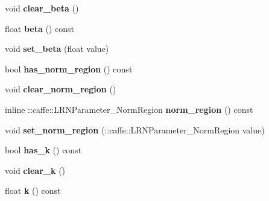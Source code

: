 \begin{DoxyCompactItemize}
\item 
\mbox{\label{classcaffe_1_1_l_r_n_parameter_aec1b14fce722dccf12d5630c13769550}} 
void {\bfseries clear\+\_\+beta} ()
\item 
\mbox{\label{classcaffe_1_1_l_r_n_parameter_a8ff89750cd0a0774085b40e9dfae1880}} 
float {\bfseries beta} () const
\item 
\mbox{\label{classcaffe_1_1_l_r_n_parameter_abcf127ad5d4fd5641b629a63e798e795}} 
void {\bfseries set\+\_\+beta} (float value)
\item 
\mbox{\label{classcaffe_1_1_l_r_n_parameter_ac7f3b6e8a687707d73843758fc86de2c}} 
bool {\bfseries has\+\_\+norm\+\_\+region} () const
\item 
\mbox{\label{classcaffe_1_1_l_r_n_parameter_af460ac5bb4e5349b480dae7431ca15c8}} 
void {\bfseries clear\+\_\+norm\+\_\+region} ()
\item 
\mbox{\label{classcaffe_1_1_l_r_n_parameter_a175f01ff863cc0f6e23ccc96430b8c20}} 
inline \+::caffe\+::\+L\+R\+N\+Parameter\+\_\+\+Norm\+Region {\bfseries norm\+\_\+region} () const
\item 
\mbox{\label{classcaffe_1_1_l_r_n_parameter_ac67e8a00e6c9261c16323958c90d3132}} 
void {\bfseries set\+\_\+norm\+\_\+region} (\+::caffe\+::\+L\+R\+N\+Parameter\+\_\+\+Norm\+Region value)
\item 
\mbox{\label{classcaffe_1_1_l_r_n_parameter_aadff1fb95a7fcfc5bccd7437cd9e53d8}} 
bool {\bfseries has\+\_\+k} () const
\item 
\mbox{\label{classcaffe_1_1_l_r_n_parameter_ae5aae57bb84667f24b81ffc40075e8b4}} 
void {\bfseries clear\+\_\+k} ()
\item 
\mbox{\label{classcaffe_1_1_l_r_n_parameter_adaff01405b00b1f57e98293cf34fb625}} 
float {\bfseries k} () const
\item 

\end{DoxyCompactItemize}
